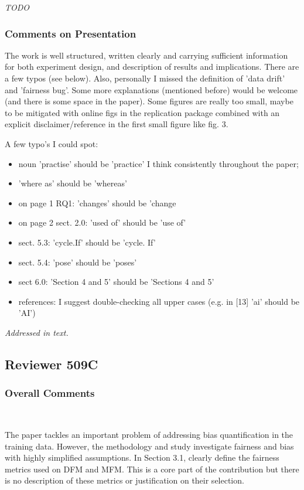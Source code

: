 \documentclass[conference,review,anonymous]{IEEEtran}
\newcommand{\highlight}[1]{\begin{framed}%
  \noindent\emph{#1}
\end{framed}}
\begin{document}
\highlight{TODO}

\subsubsection{Comments on Presentation}

The work is well structured, written clearly and carrying sufficient
information for both experiment design, and description of results and
implications. There are a few typos (see below). Also, personally
I missed the definition of 'data drift' and 'fairness bug'. Some more
explanations (mentioned before) would be welcome (and there is some
space in the paper). Some figures are really too small, maybe to be
mitigated with online figs in the replication package combined with an
explicit disclaimer/reference in the first small figure like fig. 3.

A few typo's I could spot:
\begin{itemize}
  \item noun 'practise' should be 'practice' I think consistently throughout the paper;
  \item 'where as' should be 'whereas'
  \item on page 1 RQ1: 'changes' should be 'change
  \item on page 2 sect. 2.0: 'used of' should be 'use of'
  \item sect. 5.3: 'cycle.If' should be 'cycle. If'
  \item sect. 5.4: 'pose' should be 'poses'
  \item sect 6.0: 'Section 4 and 5' should be 'Sections 4 and 5'
  \item references: I suggest double-checking all upper cases (e.g. in
    [13] 'ai' should be 'AI')
\end{itemize}

\highlight{Addressed in text.}

\subsection{Reviewer 509C}

\subsubsection{Overall Comments}~\label{sec:509c-overall}

The paper tackles an important problem of addressing bias
quantification in the training data. However, the methodology and
study investigate fairness and bias with highly simplified
assumptions. In Section 3.1, clearly define the fairness metrics used
on DFM and MFM. This is a core part of the contribution but there is
no description of these metrics or justification on their
selection.
\end{document}
